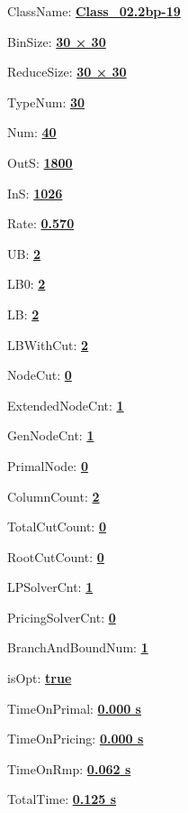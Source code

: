 \documentclass[11pt]{article}
\begin{document}
\pagestyle{empty}


ClassName: \underline{\textbf{Class_02.2bp-19}}
\par
BinSize: \underline{\textbf{30 × 30}}
\par
ReduceSize: \underline{\textbf{30 × 30}}
\par
TypeNum: \underline{\textbf{30}}
\par
Num: \underline{\textbf{40}}
\par
OutS: \underline{\textbf{1800}}
\par
InS: \underline{\textbf{1026}}
\par
Rate: \underline{\textbf{0.570}}
\par
UB: \underline{\textbf{2}}
\par
LB0: \underline{\textbf{2}}
\par
LB: \underline{\textbf{2}}
\par
LBWithCut: \underline{\textbf{2}}
\par
NodeCut: \underline{\textbf{0}}
\par
ExtendedNodeCnt: \underline{\textbf{1}}
\par
GenNodeCnt: \underline{\textbf{1}}
\par
PrimalNode: \underline{\textbf{0}}
\par
ColumnCount: \underline{\textbf{2}}
\par
TotalCutCount: \underline{\textbf{0}}
\par
RootCutCount: \underline{\textbf{0}}
\par
LPSolverCnt: \underline{\textbf{1}}
\par
PricingSolverCnt: \underline{\textbf{0}}
\par
BranchAndBoundNum: \underline{\textbf{1}}
\par
isOpt: \underline{\textbf{true}}
\par
TimeOnPrimal: \underline{\textbf{0.000 s}}
\par
TimeOnPricing: \underline{\textbf{0.000 s}}
\par
TimeOnRmp: \underline{\textbf{0.062 s}}
\par
TotalTime: \underline{\textbf{0.125 s}}
\par
\newpage
\end{document}
